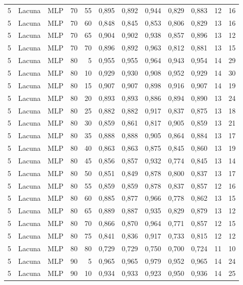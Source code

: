 \begin{longtable}{@{}rllrrrrrrrrr@{}}
5 & Lacuna & MLP & 70 & 55 & 0,895 & 0,892 & 0,944 & 0,829 & 0,883 & 12 & 16 \\
5 & Lacuna & MLP & 70 & 60 & 0,848 & 0,845 & 0,853 & 0,806 & 0,829 & 13 & 16 \\
5 & Lacuna & MLP & 70 & 65 & 0,904 & 0,902 & 0,938 & 0,857 & 0,896 & 13 & 12 \\
5 & Lacuna & MLP & 70 & 70 & 0,896 & 0,892 & 0,963 & 0,812 & 0,881 & 13 & 15 \\
5 & Lacuna & MLP & 80 & 5 & 0,955 & 0,955 & 0,964 & 0,943 & 0,954 & 14 & 29 \\
5 & Lacuna & MLP & 80 & 10 & 0,929 & 0,930 & 0,908 & 0,952 & 0,929 & 14 & 30 \\
5 & Lacuna & MLP & 80 & 15 & 0,907 & 0,907 & 0,898 & 0,916 & 0,907 & 14 & 19 \\
5 & Lacuna & MLP & 80 & 20 & 0,893 & 0,893 & 0,886 & 0,894 & 0,890 & 13 & 24 \\
5 & Lacuna & MLP & 80 & 25 & 0,882 & 0,882 & 0,917 & 0,837 & 0,875 & 13 & 18 \\
5 & Lacuna & MLP & 80 & 30 & 0,859 & 0,861 & 0,817 & 0,905 & 0,859 & 13 & 21 \\
5 & Lacuna & MLP & 80 & 35 & 0,888 & 0,888 & 0,905 & 0,864 & 0,884 & 13 & 17 \\
5 & Lacuna & MLP & 80 & 40 & 0,863 & 0,863 & 0,875 & 0,845 & 0,860 & 13 & 19 \\
5 & Lacuna & MLP & 80 & 45 & 0,856 & 0,857 & 0,932 & 0,774 & 0,845 & 13 & 14 \\
5 & Lacuna & MLP & 80 & 50 & 0,851 & 0,849 & 0,878 & 0,800 & 0,837 & 13 & 17 \\
5 & Lacuna & MLP & 80 & 55 & 0,859 & 0,859 & 0,878 & 0,837 & 0,857 & 12 & 16 \\
5 & Lacuna & MLP & 80 & 60 & 0,885 & 0,877 & 0,966 & 0,778 & 0,862 & 13 & 15 \\
5 & Lacuna & MLP & 80 & 65 & 0,889 & 0,887 & 0,935 & 0,829 & 0,879 & 13 & 12 \\
5 & Lacuna & MLP & 80 & 70 & 0,866 & 0,870 & 0,964 & 0,771 & 0,857 & 12 & 15 \\
5 & Lacuna & MLP & 80 & 75 & 0,841 & 0,836 & 0,917 & 0,733 & 0,815 & 12 & 12 \\
5 & Lacuna & MLP & 80 & 80 & 0,729 & 0,729 & 0,750 & 0,700 & 0,724 & 11 & 10 \\
5 & Lacuna & MLP & 90 & 5 & 0,965 & 0,965 & 0,979 & 0,952 & 0,965 & 14 & 24 \\
5 & Lacuna & MLP & 90 & 10 & 0,934 & 0,933 & 0,923 & 0,950 & 0,936 & 14 & 25 \\

\end{longtable}
